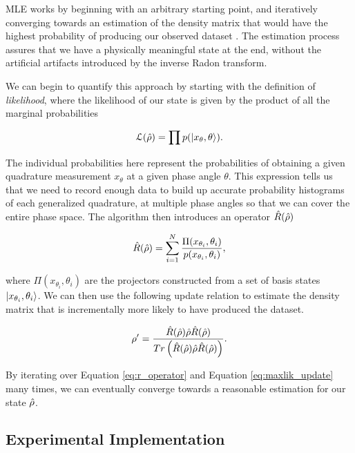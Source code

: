MLE works by beginning with an arbitrary starting point, and iteratively converging towards an estimation of the density matrix that would have the highest probability of producing our observed dataset \cite{RevModPhys.81.299}. The estimation process assures that we have a physically meaningful state at the end, without the artificial artifacts introduced by the inverse Radon transform.

We can begin to quantify this approach by starting with the definition of \emph{likelihood}, where the likelihood of our state is given by the product of all the marginal probabilities

\begin{equation}
  \label{eq:quantum_likelihood}
  \mathcal{L}(\hat{\rho}) = \prod p(\left| x_{\theta}, \theta \right>).
\end{equation}

\noindent
The individual probabilities here represent the probabilities of obtaining a given quadrature measurement $x_{\theta}$ at a given phase angle $\theta $.  This expression tells us that we need to record enough data to build up accurate probability histograms of each generalized quadrature, at multiple phase angles so that we can cover the entire phase space.  The algorithm then introduces an operator $\hat{R}(\hat{\rho})$

\begin{equation}
  \label{eq:r_operator}
  \hat{R}(\hat{\rho}) = \sum^N_{i=1} \frac{\Pi(x_{\theta_i}, \theta_i)}{p(x_{\theta_i}, \theta_i)} ,
\end{equation}

\noindent
where $\Pi(x_{\theta_i}, \theta_i)$ are the projectors constructed from a set of basis states $\left| x_{\theta_i}, \theta_i \right>$.  We can then use the following update relation to estimate the density matrix that is incrementally more likely to have produced the dataset.

\begin{equation}
  \label{eq:maxlik_update}
  \rho' = \frac{\hat{R}(\hat{\rho})\hat{\rho} \hat{R}(\hat{\rho})}{Tr \left( \hat{R}(\hat{\rho}) \hat{\rho} \hat{R}(\hat{\rho}) \right)} .
\end{equation}

\noindent
By iterating over Equation \ref{eq:r_operator} and Equation \ref{eq:maxlik_update} many times, we can eventually converge towards a reasonable estimation for our state $\hat{\rho}$.


\subsection{Experimental Implementation} 
\label{experimental_implementation} 


